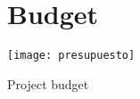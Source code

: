 \chapter{Budget}
\begin{table}
\centering
\texttt{[image: presupuesto]} 
\caption{\label{tab:costs}Project budget}
\end{table}
